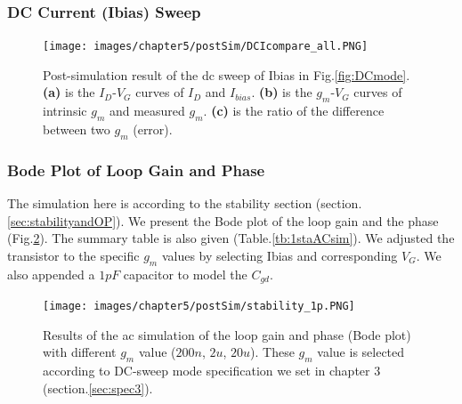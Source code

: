 {\subsubsection{DC Current (Ibias) Sweep}

\begin{figure}[!htbp]
    \centering
        \texttt{[image: images/chapter5/postSim/DCIcompare\_all.PNG]}
    \caption{Post-simulation result of the dc sweep of Ibias in Fig.\ref{fig:DCmode}. \textbf{(a)} is the $I_D$-$V_G$ curves of $I_D$ and $I_{bias}$. \textbf{(b)} is the $g_m$-$V_G$ curves of intrinsic $g_m$ and measured $g_m$. \textbf{(c)} is the ratio of the difference between two $g_m$ (error).}
    \label{fig:sim:DCIcompare}
\end{figure}

\subsubsection{Bode Plot of Loop Gain and Phase}
The simulation here is according to the stability section (section.\ref{sec:stabilityandOP}).
We present the Bode plot of the loop gain and the phase (Fig.\ref{fig:sim:loopsim}).
The summary table is also given (Table.\ref{tb:1staACsim}).
We adjusted the transistor to the specific $g_m$ values by selecting Ibias and corresponding $V_G$.
We also appended a $1pF$ capacitor to model the $C_{gd}$.


\begin{figure}[!htb]
    \centering
        \texttt{[image: images/chapter5/postSim/stability\_1p.PNG]}
    \caption{Results of the ac simulation of the loop gain and phase (Bode plot) with different $g_m$ value ($200n$, $2u$, $20u$). These $g_m$ value is selected according to DC-sweep mode specification we set in chapter 3 (section.\ref{sec:spec3}).}
    \label{fig:sim:loopsim}
\end{figure}


}
